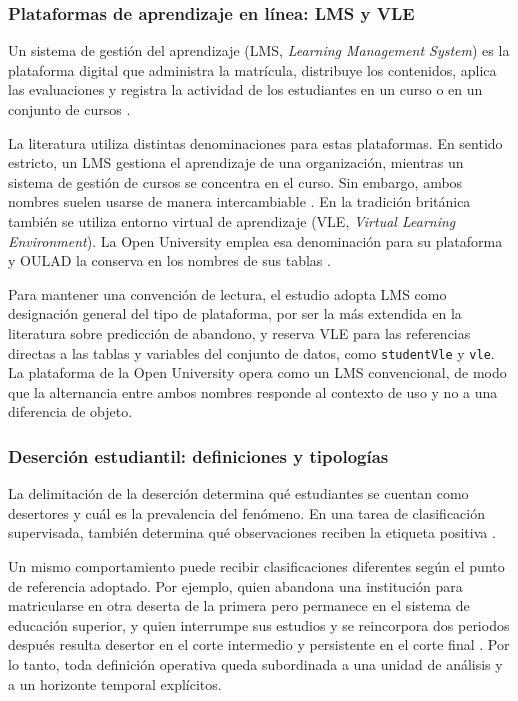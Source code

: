 \subsubsection{Plataformas de aprendizaje en línea: LMS y VLE}

Un sistema de gestión del aprendizaje (LMS, \textit{Learning Management System}) es la plataforma digital que administra la matrícula, distribuye los contenidos, aplica las evaluaciones y registra la actividad de los estudiantes en un curso o en un conjunto de cursos \cite{educsci11090552}. 

La literatura utiliza distintas denominaciones para estas plataformas. En sentido estricto, un LMS gestiona el aprendizaje de una organización, mientras un sistema de gestión de cursos se concentra en el curso. Sin embargo, ambos nombres suelen usarse de manera intercambiable \cite{watson2007}. En la tradición británica también se utiliza entorno virtual de aprendizaje (VLE, \textit{Virtual Learning Environment}). La Open University emplea esa denominación para su plataforma y OULAD la conserva en los nombres de sus tablas \cite{sdata2017171}.

Para mantener una convención de lectura, el estudio adopta LMS como designación general del tipo de plataforma, por ser la más extendida en la literatura sobre predicción de abandono, y reserva VLE para las referencias directas a las tablas y variables del conjunto de datos, como \texttt{studentVle} y \texttt{vle}. La plataforma de la Open University opera como un LMS convencional, de modo que la alternancia entre ambos nombres responde al contexto de uso y no a una diferencia de objeto.


\subsubsection{Deserción estudiantil: definiciones y tipologías}

La delimitación de la deserción determina qué estudiantes se cuentan como desertores y cuál es la prevalencia del fenómeno. En una tarea de clasificación supervisada, también determina qué observaciones reciben la etiqueta positiva \cite{tinto1975}. 

Un mismo comportamiento puede recibir clasificaciones diferentes según el punto de referencia adoptado. Por ejemplo, quien abandona una institución para matricularse en otra deserta de la primera pero permanece en el sistema de educación superior, y quien interrumpe sus estudios y se reincorpora dos periodos después resulta desertor en el corte intermedio y persistente en el corte final \cite{tinto1975,himmel2002}. Por lo tanto, toda definición operativa queda subordinada a una unidad de análisis y a un horizonte temporal explícitos.


